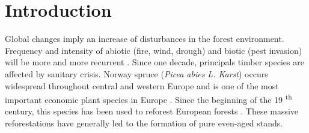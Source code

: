 \documentclass[3p,procedia]{elsarticle}
\begin{document}
\linenumbers

\pagebreak
\section{Introduction}


Global changes imply an increase of disturbances in the forest environment.
Frequency and intensity of abiotic (fire, wind, drough) and biotic (pest invasion) will be more and more recurrent \citep{lindner_climate_2010}. 
Since one decade, principals timber species are affected by sanitary crisis.
Norway spruce (\textit{Picea abies L. Karst}) occurs widespread throughout central and western Europe and is one of the most important economic plant species in Europe \citep{nystedt_norway_2013}.
Since the beginning of the 19 \textsuperscript{th} century, this species has been used to reforest European forests
\citep{vonTeuffel_2004}.
These massive reforestations have generally led to the formation of pure even-aged stands. 
\end{document}
